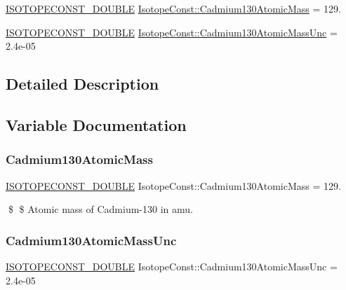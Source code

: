 \begin{DoxyCompactItemize}
\item 
\mbox{\hyperlink{group___isotope_const-_macros_ga8f45a7272ce02c0b4c65c44636ed719a}{I\+S\+O\+T\+O\+P\+E\+C\+O\+N\+S\+T\+\_\+\+D\+O\+U\+B\+LE}} \mbox{\hyperlink{group___isotope_const-_cadmium-_cd130_ga38ef33fd0d87f045ff03dd25d55acd9e}{Isotope\+Const\+::\+Cadmium130\+Atomic\+Mass}} = 129.
\item 
\mbox{\hyperlink{group___isotope_const-_macros_ga8f45a7272ce02c0b4c65c44636ed719a}{I\+S\+O\+T\+O\+P\+E\+C\+O\+N\+S\+T\+\_\+\+D\+O\+U\+B\+LE}} \mbox{\hyperlink{group___isotope_const-_cadmium-_cd130_gaeabae49a1bb564d4ac852091f6b6550b}{Isotope\+Const\+::\+Cadmium130\+Atomic\+Mass\+Unc}} = 2.\+4e-\/05
\end{DoxyCompactItemize}


\subsection{Detailed Description}


\subsection{Variable Documentation}
\mbox{\label{group___isotope_const-_cadmium-_cd130_ga38ef33fd0d87f045ff03dd25d55acd9e}} 
\subsubsection{\texorpdfstring{Cadmium130\+Atomic\+Mass}{Cadmium130AtomicMass}}
{\footnotesize\ttfamily \mbox{\hyperlink{group___isotope_const-_macros_ga8f45a7272ce02c0b4c65c44636ed719a}{I\+S\+O\+T\+O\+P\+E\+C\+O\+N\+S\+T\+\_\+\+D\+O\+U\+B\+LE}} Isotope\+Const\+::\+Cadmium130\+Atomic\+Mass = 129.}

\$ \$ Atomic mass of Cadmium-\/130 in amu. \mbox{\label{group___isotope_const-_cadmium-_cd130_gaeabae49a1bb564d4ac852091f6b6550b}} 
\subsubsection{\texorpdfstring{Cadmium130\+Atomic\+Mass\+Unc}{Cadmium130AtomicMassUnc}}
{\footnotesize\ttfamily \mbox{\hyperlink{group___isotope_const-_macros_ga8f45a7272ce02c0b4c65c44636ed719a}{I\+S\+O\+T\+O\+P\+E\+C\+O\+N\+S\+T\+\_\+\+D\+O\+U\+B\+LE}} Isotope\+Const\+::\+Cadmium130\+Atomic\+Mass\+Unc = 2.\+4e-\/05}

